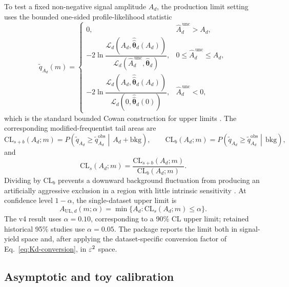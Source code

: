 To test a fixed non-negative signal amplitude $A_d$, the production limit setting uses
the bounded one-sided profile-likelihood statistic
\begin{equation}
\tilde q_{A_d}(m)=
\begin{cases}
0, &
\hat A_d^{\,\mathrm{unc}} > A_d, \\
-2\ln
\dfrac{\mathcal{L}_d\!\left(A_d,\hat{\hat{\bm{\theta}}}_d(A_d)\right)}
{\mathcal{L}_d\!\left(\hat A_d^{\,\mathrm{unc}},\hat{\bm{\theta}}_d\right)}, &
0\le \hat A_d^{\,\mathrm{unc}}\le A_d, \\
-2\ln
\dfrac{\mathcal{L}_d\!\left(A_d,\hat{\hat{\bm{\theta}}}_d(A_d)\right)}
{\mathcal{L}_d\!\left(0,\hat{\hat{\bm{\theta}}}_d(0)\right)}, &
\hat A_d^{\,\mathrm{unc}} < 0,
\end{cases}
\label{eq:qmu-single}
\end{equation}
which is the standard bounded Cowan construction for upper limits \cite{Cowan2011}.
The corresponding modified-frequentist tail areas are
\begin{equation}
\mathrm{CL}_{s+b}(A_d;m)
=
P\!\left(
\tilde q_{A_d}\ge \tilde q_{A_d}^{\mathrm{obs}}
\middle|\,
A_d+\mathrm{bkg}
\right),
\qquad
\mathrm{CL}_{b}(A_d;m)
=
P\!\left(
\tilde q_{A_d}\ge \tilde q_{A_d}^{\mathrm{obs}}
\middle|\,
\mathrm{bkg}
\right),
\end{equation}
and
\begin{equation}
\mathrm{CL}_{s}(A_d;m)=
\frac{\mathrm{CL}_{s+b}(A_d;m)}{\mathrm{CL}_{b}(A_d;m)}.
\label{eq:cls-definition}
\end{equation}
Dividing by $\mathrm{CL}_b$ prevents a downward background fluctuation from producing
an artificially aggressive exclusion in a region with little intrinsic sensitivity
\cite{Junk1999,Read2002}. At confidence level $1-\alpha$, the single-dataset upper
limit is
\begin{equation}
A_{\mathrm{UL},d}(m;\alpha)
=\min\{A_d:\mathrm{CL}_s(A_d;m)\le\alpha\}.
\label{eq:aul-single}
\end{equation}
The v4 result uses $\alpha=0.10$, corresponding to a 90\% CL upper limit; retained
historical 95\% studies use $\alpha=0.05$. The package reports the limit both in
signal-yield space and, after applying the dataset-specific conversion factor of
Eq.~\eqref{eq:Kd-conversion}, in $\varepsilon^2$ space.

\subsection{Asymptotic and toy calibration}

